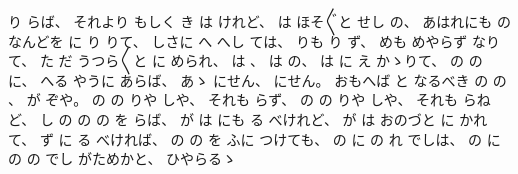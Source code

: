 り
らば、
%
それより
%
もしく
き
は
けれど、
%
は
ほそ〴〵と
せし
の、
%
あはれにも
の
なんどを
に
り
りて、
%
しさに
へ
%
へし
ては、
%
りも
り
ず、
%
めも
めやらず
なりて、
%
た
だ%
うつら〳〵と
に
められ、
%
は
、%
%
は
の、
%
は%
に
え
かゝりて、%
%
の
の
に、
%
へる
やうに
あらば、
%
あゝ%
にせん、
%
にせん。
%
おもへば
と
なるべき
の
の
、
%
が
ぞや。
%
の
の
りや
しや、
%
それも
らず、
%
の
の
りや
しや、
%
それも
らねど、
%
し
の
の
の
を
らば、
%
が
は
にも%
る
べけれど、
%
が
は
%
おのづと
に
かれて、
%
ず
に
る
べければ、
%
の
の
を
ふに
つけても、
%
の
に
の
れ
でしは、
%
の
に
の
の
でし
がためかと、
%
ひやらるゝ%
